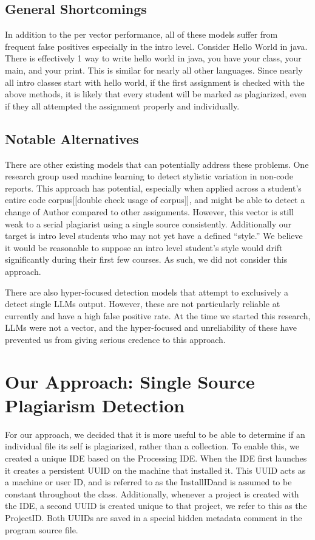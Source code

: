 \documentclass[conference]{IEEEtran}
\newcommand{\n}{\hfill\break}
\newcommand{\installID}{InstallID}
\newcommand{\projectID}{ProjectID}
\begin{document}
\subsection*{\textbf{General Shortcomings}}
In addition to the per vector performance, all of these models suffer from frequent false positives especially in the intro level.  Consider Hello World in java.  There is effectively 1 way to write hello world in java, you have your class, your main, and your print.  This is similar for nearly all other languages.  Since nearly all intro classes start with hello world, if the first assignment is checked with the above methods, it is likely that every student will be marked as plagiarized, even if they all attempted the assignment properly and individually.

\subsection*{\textbf{Notable Alternatives}}
There are other existing models that can potentially address these problems.  One research group used machine learning to detect stylistic variation in non-code reports. \cite{english}  This approach has potential, especially when applied across a student's entire code corpus[[double check usage of corpus]], and might be able to detect a change of Author compared to other assignments.  However, this vector is still weak to a serial plagiarist using a single source consistently.  Additionally our target is intro level students who may not yet have a defined ``style.''  We believe it would be reasonable to suppose an intro level student's style would drift significantly during their first few courses.  As such, we did not consider this approach.

There are also hyper-focused detection models that attempt to exclusively a detect single LLMs output.\cite{llm detect}  However, these are not particularly reliable at currently\cite{23 percent} and have a high false positive rate. \cite{and you fail}  At the time we started this research, LLMs were not a vector, and the hyper-focused and unreliability of these have prevented us from giving serious credence to this approach. 
\n\section{\textbf{Our Approach:} Single Source Plagiarism Detection}
For our approach, we decided that it is more useful to be able to determine if an individual file its self is plagiarized, rather than a collection.  To enable this, we created a unique IDE based on the Processing IDE.  When the IDE first launches it creates a persistent UUID on the machine that installed it.  This UUID acts as a machine or user ID, and is referred to as the \installID and is assumed to be constant throughout the class.  Additionally, whenever a project is created with the IDE, a second UUID is created unique to that project, we refer to this as the \projectID.  Both UUIDs are saved in a special hidden metadata comment in the program source file.
\end{document}
